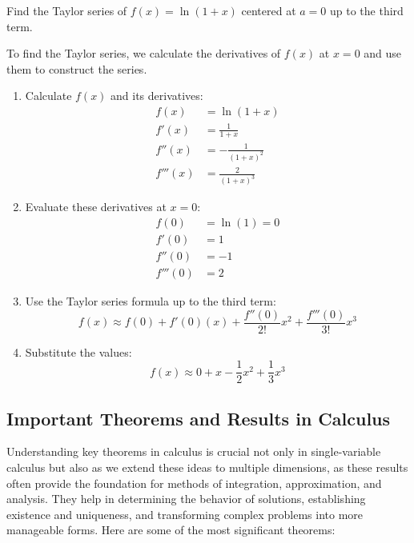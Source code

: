 \exampleline
\begin{example}
Find the Taylor series of \( f(x) = \ln(1+x) \) centered at \( a=0 \) up to the third term.

\begin{solution}
To find the Taylor series, we calculate the derivatives of \( f(x) \) at \( x=0 \) and use them to construct the series.

\begin{enumerate}
    \item Calculate \( f(x) \) and its derivatives:
    \begin{align*}
    f(x) &= \ln(1+x) \\
    f'(x) &= \frac{1}{1+x} \\
    f''(x) &= -\frac{1}{(1+x)^2} \\
    f'''(x) &= \frac{2}{(1+x)^3}
    \end{align*}

    \item Evaluate these derivatives at \( x=0 \):
    \begin{align*}
    f(0) &= \ln(1) = 0 \\
    f'(0) &= 1 \\
    f''(0) &= -1 \\
    f'''(0) &= 2
    \end{align*}

    \item Use the Taylor series formula up to the third term:
    \[
    f(x) \approx f(0) + f'(0)(x) + \frac{f''(0)}{2!}x^2 + \frac{f'''(0)}{3!}x^3
    \]

    \item Substitute the values:
    \[
    f(x) \approx 0 + x - \frac{1}{2}x^2 + \frac{1}{3}x^3
    \]
\end{enumerate}
\end{solution}
\end{example}
\exampleline


\subsection*{Important Theorems and Results in Calculus} 

\noindent Understanding key theorems in calculus is crucial not only in single-variable calculus but also as we extend these ideas to multiple dimensions, as these results often provide the foundation for methods of integration, approximation, and analysis. They help in determining the behavior of solutions, establishing existence and uniqueness, and transforming complex problems into more manageable forms. Here are some of the most significant theorems:

